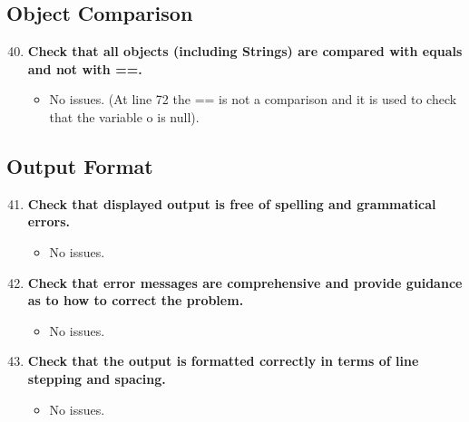 \documentclass{article}
\begin{document}
		\subsection{Object Comparison}
			\begin{enumerate}
				\setcounter{enumi}{39}
				\item \textbf{Check that all objects (including Strings) are compared with equals and not with ==.}
				\begin{itemize}
					\item No issues. (At line 72 the == is not a comparison and it is used to check that the variable o is null).
				\end{itemize}
			\end{enumerate}
		\subsection{Output Format}
			\begin{enumerate}
				\setcounter{enumi}{40}
				\item \textbf{Check that displayed output is free of spelling and grammatical errors.}
				\begin{itemize}
					\item No issues.
				\end{itemize}
				\item \textbf{Check that error messages are comprehensive and provide guidance as to how to correct the problem.}
				\begin{itemize}
					\item No issues.
				\end{itemize}
				\item \textbf{Check that the output is formatted correctly in terms of line stepping and spacing.}
				\begin{itemize}
					\item No issues.
				\end{itemize}
			\end{enumerate}
\end{document}

